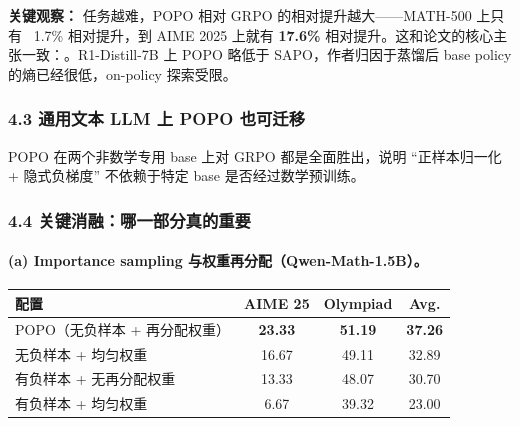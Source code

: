 \begin{summarybox}
\textbf{关键观察：} 任务越难，POPO 相对 GRPO 的相对提升越大——MATH-500 上只有 ~1.7\% 相对提升，到 AIME 2025 上就有 \textbf{17.6\%} 相对提升。这和论文的核心主张一致：。R1-Distill-7B 上 POPO 略低于 SAPO，作者归因于蒸馏后 base policy 的熵已经很低，on-policy 探索受限。
\end{summarybox}

\subsubsection{4.3 通用文本 LLM 上 POPO 也可迁移}

\begin{center}
\end{center}

POPO 在两个非数学专用 base 上对 GRPO 都是全面胜出，说明 ``正样本归一化 + 隐式负梯度'' 不依赖于特定 base 是否经过数学预训练。

\subsubsection{4.4 关键消融：哪一部分真的重要}

\paragraph{(a) Importance sampling 与权重再分配（Qwen-Math-1.5B）。}

\begin{center}
\begin{tabular}{lccc}
\toprule
\textbf{配置} & \textbf{AIME 25} & \textbf{Olympiad} & \textbf{Avg.}\\
\midrule
POPO（无负样本 + 再分配权重） & \textbf{23.33} & \textbf{51.19} & \textbf{37.26}\\
无负样本 + 均匀权重           & 16.67 & 49.11 & 32.89\\
有负样本 + 无再分配权重       & 13.33 & 48.07 & 30.70\\
有负样本 + 均匀权重           & 6.67  & 39.32 & 23.00\\
\bottomrule
\end{tabular}
\end{center}

